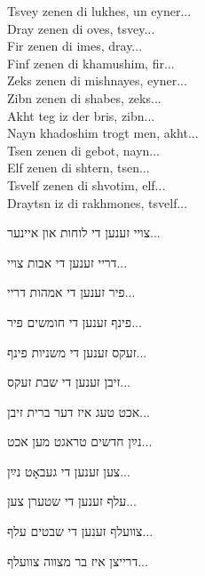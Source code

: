 \begin{minipage}[t]{0.52\linewidth}
\begin{english}
Tsvey zenen di lukhes, \hfill {\small un eyner...} \\
Dray zenen di oves, \hfill {\small tsvey...} \\
Fir zenen di imes, \hfill {\small dray...} \\
Finf zenen di khamushim, \hfill {\small fir...} \\
Zeks zenen di mishnayes, \hfill {\small eyner...} \\
Zibn zenen di shabes, \hfill {\small zeks...} \\
Akht teg iz der bris, \hfill {\small zibn...} \\
Nayn khadoshim trogt men, \hfill {\small akht...} \\
Tsen zenen di gebot, \hfill {\small nayn...} \\
Elf zenen di shtern, \hfill {\small tsen...}\\
Tsvelf zenen di shvotim, \hfill {\small elf...} \\
Draytsn iz di rakhmones, \hfill {\small tsvelf...} \\
\end{english}
\end{minipage} \hspace{0.02\linewidth}
\begin{minipage}[t]{0.44\linewidth}
צויי זענען די לוחות
{\hfill \tiny
און איינער...
}

דריי זענען די אבות
{\hfill \tiny
צויי...
}

פיר זענען די אמהות
{\hfill \tiny
דריי...
}

פינף זענען די חומשים
{\hfill \tiny
פיר...
}

זעקס זענען די משניות
{\hfill \tiny
פינף...
}

זיבן זענען די שבת
{\hfill \tiny
זעקס...
}

אכט טעג איז דער ברית
{\hfill \tiny
זיבן...
}

נײַן חדשים טראגט מען
{\hfill \tiny
אכט...
}

צען זענען די געבאָט
{\hfill \tiny
נײַן...
}

עלף זענען די שטערן
{\hfill \tiny
צען...
}

צוועלף זענען די שבטים
{\hfill \tiny
עלף...
}

דרייצן איז בר מצווה
{\hfill \tiny
צוועלף...
}
\end{minipage}

\vspace{1em}

